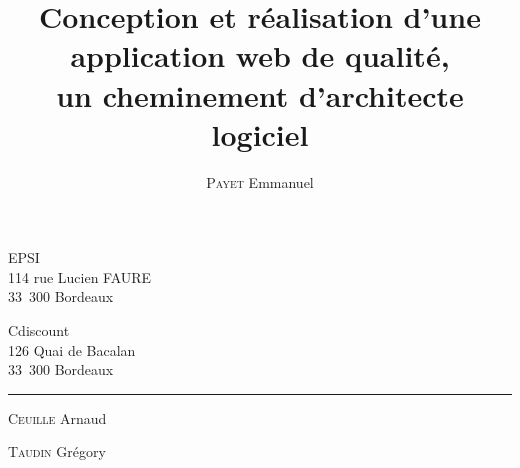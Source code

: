 \title{Conception et réalisation d’une application web de qualité,\\ un cheminement d’architecte logiciel}
\author{\textsc{Payet} Emmanuel}
\makeatletter

\vspace*{1cm}
\begin{minipage}{.5\textwidth}
    EPSI\\
     114 rue Lucien FAURE\\
     33 300 Bordeaux
\end{minipage}
\begin{minipage}{.5\textwidth}
    \begin{flushright}
        Cdiscount\\
        126 Quai de Bacalan\\
        33 300 Bordeaux
    \end{flushright}
\end{minipage}

\begin{center}
    \vspace*{7cm}
    \textsc{\@title}
    \HRule
    \vspace*{0.5cm}
    \large{\@author}
\end{center}

\vfill

\rule{\textwidth}{0.2mm}
\begin{minipage}{.33\textwidth}
    \textsc{Ceuille} Arnaud
\end{minipage}
\begin{minipage}{.33\textwidth}
    \begin{center}
        \@date
    \end{center}
\end{minipage}
\begin{minipage}{.33\textwidth}
    \begin{flushright}
        \textsc{Taudin} Grégory
    \end{flushright}
\end{minipage}
